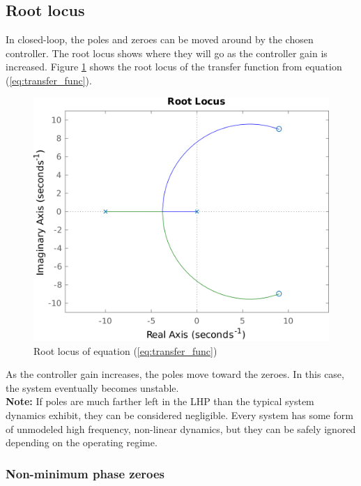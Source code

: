 \documentclass[10pt,conference,compsoc]{IEEEtran}
\begin{document}
\subsection{Root locus}

In closed-loop, the poles and zeroes can be moved around by the chosen
controller. The root locus shows where they will go as the controller gain is
increased. Figure \ref{fig:poster_rlocus} shows the root locus of the transfer
function from equation (\ref{eq:transfer_func}).

\begin{figure}[H]
  \includegraphics[width=\linewidth]{figs/poster_rlocus.png}
  \caption{Root locus of equation (\ref{eq:transfer_func})}
  \label{fig:poster_rlocus}
\end{figure}

As the controller gain increases, the poles move toward the zeroes. In this
case, the \gls{system} eventually becomes unstable. \\

\textbf{Note:} If poles are much farther left in the LHP than the typical
\gls{system} dynamics exhibit, they can be considered negligible. Every
\gls{system} has some form of unmodeled high frequency, non-linear dynamics, but
they can be safely ignored depending on the operating regime.

\subsubsection{Non-minimum phase zeroes}
\end{document}
